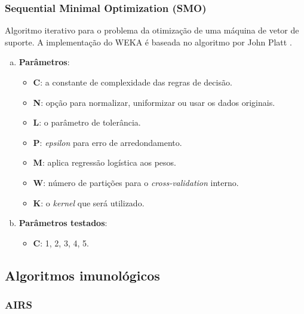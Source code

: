 \subsubsection{Sequential Minimal Optimization (SMO)}

Algoritmo iterativo para o problema da otimização de uma máquina de vetor de suporte. A implementação do WEKA é baseada no algoritmo por John Platt \cite{Platt1998}.

\begin{enumerate}[a)]
    \item \textbf{Parâmetros}:
        \begin{itemize}
            \item \textbf{C}: a constante de complexidade das regras de decisão.
            \item \textbf{N}: opção para normalizar, uniformizar ou usar os dados originais.
            \item \textbf{L}: o parâmetro de tolerância.
            \item \textbf{P}: \emph{epsilon} para erro de arredondamento.
            \item \textbf{M}: aplica regressão logística aos pesos.
            \item \textbf{W}: número de partições para o \emph{cross-validation} interno.
            \item \textbf{K}: o \emph{kernel} que será utilizado.
        \end{itemize}
    \item \textbf{Parâmetros testados}:
        \begin{itemize}
            \item \textbf{C}: 1, 2, 3, 4, 5.
        \end{itemize}
\end{enumerate}

\subsection{Algoritmos imunológicos}

\subsubsection{AIRS}

